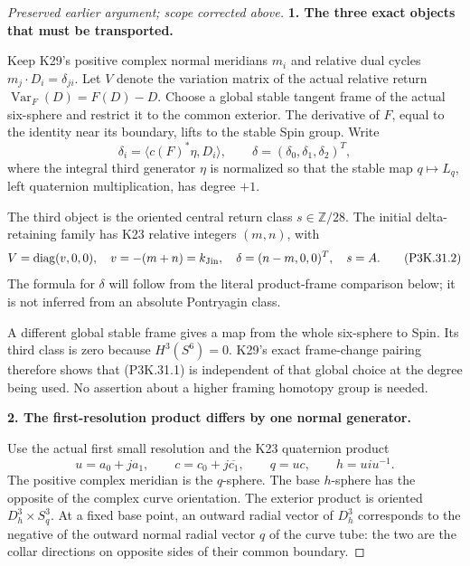 \begin{proof}[Preserved earlier argument; scope corrected above]
\par\medskip\noindent\textbf{1. The three exact objects that must be transported.}\enspace

Keep K29's positive complex normal meridians \(m_i\) and relative
dual cycles \(m_j\cdot D_i=\delta_{ji}\). Let \(V\) denote the
variation matrix of the actual relative return
\(\operatorname{Var}_F(D)=F(D)-D\). Choose a global stable tangent
frame of the actual six-sphere and restrict it to the common exterior.
The derivative of \(F\), equal to the identity near its boundary,
lifts to the stable Spin group. Write
\[
 \delta_i=\langle c(F)^*\eta,D_i\rangle,\qquad
       \delta=(\delta_0,\delta_1,\delta_2)^T,
                                                        \tag{P3K.31.1}
\]
where the integral third generator \(\eta\) is normalized so that
the stable map \(q\mapsto L_q\), left quaternion multiplication,
has degree \(+1\).

The third object is the oriented central return class \(s\in\mathbb Z/28\).
The initial delta-retaining family has K23 relative integers
\((m,n)\), with
\[
       V=\operatorname{diag}(v,0,0),\quad
       v=-(m+n)=k_{\rm Jin},\quad
       \delta=(n-m,0,0)^T,\quad s=A.
                                                        \tag{P3K.31.2}
\]
The formula for \(\delta\) will follow from the literal product-frame
comparison below; it is not inferred from an absolute Pontryagin class.

A different global stable frame gives a map from the whole six-sphere
to Spin. Its third class is zero because \(H^3(S^6)=0\).
K29's exact frame-change pairing therefore shows that (P3K.31.1) is
independent of that global choice at the degree being used.
No assertion about a higher framing homotopy group is needed.

\par\medskip\noindent\textbf{2. The first-resolution product differs by one normal generator.}\enspace

Use the actual first small resolution and the K23 quaternion product
\[
 u=a_0+j a_1,\qquad
 c=c_0+j\overline{c_1},\qquad
 q=uc,\qquad h=u i u^{-1}.
                                                        \tag{P3K.31.3}
\]
The positive complex meridian is the \(q\)-sphere. The base
\(h\)-sphere has the opposite of the complex curve orientation.
The exterior product is oriented \(D^3_h\times S^3_q\).
At a fixed base point, an outward radial vector of \(D^3_h\)
corresponds to the negative of the outward normal radial
vector \(q\) of the curve tube: the two are the collar
directions on opposite sides of their common boundary.


\end{proof}
